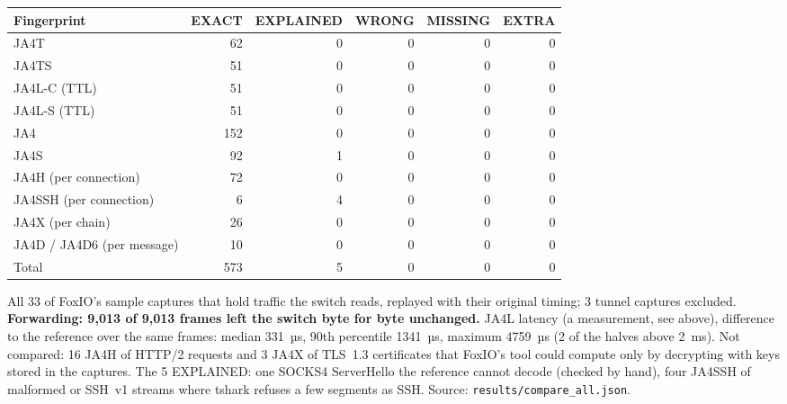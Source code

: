 \begin{center}\begin{tabular}{lrrrrr}\toprule
\textbf{Fingerprint} & \textbf{EXACT} & \textbf{EXPLAINED} & \textbf{WRONG} & \textbf{MISSING} & \textbf{EXTRA}\\\midrule
JA4T & 62 & 0 & 0 & 0 & 0\\
JA4TS & 51 & 0 & 0 & 0 & 0\\
JA4L-C (TTL) & 51 & 0 & 0 & 0 & 0\\
JA4L-S (TTL) & 51 & 0 & 0 & 0 & 0\\
JA4 & 152 & 0 & 0 & 0 & 0\\
JA4S & 92 & 1 & 0 & 0 & 0\\
JA4H (per connection) & 72 & 0 & 0 & 0 & 0\\
JA4SSH (per connection) & 6 & 4 & 0 & 0 & 0\\
JA4X (per chain) & 26 & 0 & 0 & 0 & 0\\
JA4D / JA4D6 (per message) & 10 & 0 & 0 & 0 & 0\\
\midrule Total & 573 & 5 & 0 & 0 & 0\\\bottomrule\end{tabular}\end{center}
All 33 of FoxIO's sample captures that hold traffic the switch reads, replayed with their original timing; 3 tunnel captures excluded. \textbf{Forwarding: 9,013 of 9,013 frames left the switch byte for byte unchanged.} JA4L latency (a measurement, see above), difference to the reference over the same frames: median 331~µs, 90th percentile 1341~µs, maximum 4759~µs (2 of the halves above 2~ms). Not compared: 16 JA4H of HTTP/2 requests and 3 JA4X of TLS~1.3 certificates that FoxIO's tool could compute only by decrypting with keys stored in the captures. The 5 EXPLAINED: one SOCKS4 ServerHello the reference cannot decode (checked by hand), four JA4SSH of malformed or SSH~v1 streams where tshark refuses a few segments as SSH. Source: \texttt{results/compare\_all.json}.
